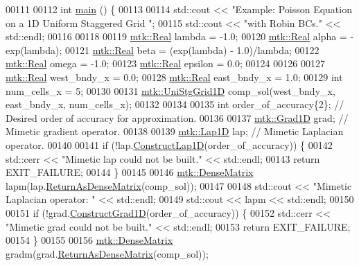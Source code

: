 \begin{DoxyCode}
00111 
00112 \textcolor{keywordtype}{int} \hyperlink{poisson__1d_8cc_ae66f6b31b5ad750f1fe042a706a4e3d4}{main} () \{
00113 
00114   std::cout << \textcolor{stringliteral}{"Example: Poisson Equation on a 1D Uniform Staggered Grid "};
00115   std::cout << \textcolor{stringliteral}{"with Robin BCs."} << std::endl;
00116 
00118 
00119   \hyperlink{group__c01-roots_gac080bbbf5cbb5502c9f00405f894857d}{mtk::Real} lambda = -1.0;
00120   \hyperlink{group__c01-roots_gac080bbbf5cbb5502c9f00405f894857d}{mtk::Real} alpha = -exp(lambda);
00121   \hyperlink{group__c01-roots_gac080bbbf5cbb5502c9f00405f894857d}{mtk::Real} beta = (exp(lambda) - 1.0)/lambda;
00122   \hyperlink{group__c01-roots_gac080bbbf5cbb5502c9f00405f894857d}{mtk::Real} omega = -1.0;
00123   \hyperlink{group__c01-roots_gac080bbbf5cbb5502c9f00405f894857d}{mtk::Real} epsilon = 0.0;
00124 
00126 
00127   \hyperlink{group__c01-roots_gac080bbbf5cbb5502c9f00405f894857d}{mtk::Real} west\_bndy\_x = 0.0;
00128   \hyperlink{group__c01-roots_gac080bbbf5cbb5502c9f00405f894857d}{mtk::Real} east\_bndy\_x = 1.0;
00129   \textcolor{keywordtype}{int} num\_cells\_x = 5;
00130 
00131   \hyperlink{classmtk_1_1UniStgGrid1D}{mtk::UniStgGrid1D} comp\_sol(west\_bndy\_x, east\_bndy\_x, num\_cells\_x);
00132 
00134 
00135   \textcolor{keywordtype}{int} order\_of\_accuracy\{2\};  \textcolor{comment}{// Desired order of accuracy for approximation.}
00136 
00137   \hyperlink{classmtk_1_1Grad1D}{mtk::Grad1D} grad;  \textcolor{comment}{// Mimetic gradient operator.}
00138 
00139   \hyperlink{classmtk_1_1Lap1D}{mtk::Lap1D} lap;  \textcolor{comment}{// Mimetic Laplacian operator.}
00140 
00141   \textcolor{keywordflow}{if} (!lap.\hyperlink{classmtk_1_1Lap1D_a685dcba88c08cf5b7b6c2aa4669a472c}{ConstructLap1D}(order\_of\_accuracy)) \{
00142     std::cerr << \textcolor{stringliteral}{"Mimetic lap could not be built."} << std::endl;
00143     \textcolor{keywordflow}{return} EXIT\_FAILURE;
00144   \}
00145 
00146   \hyperlink{classmtk_1_1DenseMatrix}{mtk::DenseMatrix} lapm(lap.\hyperlink{classmtk_1_1Lap1D_aaea34a17b0879e05eb4109645a2ba8f4}{ReturnAsDenseMatrix}(comp\_sol));
00147 
00148   std::cout << \textcolor{stringliteral}{"Mimetic Laplacian operator: "} << std::endl;
00149   std::cout << lapm << std::endl;
00150 
00151   \textcolor{keywordflow}{if} (!grad.\hyperlink{classmtk_1_1Grad1D_a74ef5245cfae6fd158bd7f563a0c2e52}{ConstructGrad1D}(order\_of\_accuracy)) \{
00152     std::cerr << \textcolor{stringliteral}{"Mimetic grad could not be built."} << std::endl;
00153     \textcolor{keywordflow}{return} EXIT\_FAILURE;
00154   \}
00155 
00156   \hyperlink{classmtk_1_1DenseMatrix}{mtk::DenseMatrix} gradm(grad.\hyperlink{classmtk_1_1Grad1D_a77b2eddbe4ab03f469306c604d505b1a}{ReturnAsDenseMatrix}(comp\_sol));

\end{DoxyCode}
